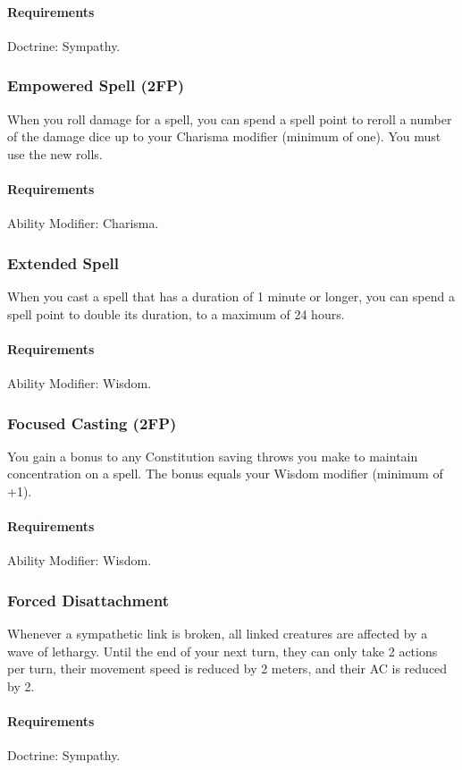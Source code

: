     \paragraph{Requirements} Doctrine: Sympathy.
\subsubsection{Empowered Spell (2FP)} \label{feat::empoweredspell}
    When you roll damage for a spell, you can spend a spell point to reroll a number of the damage dice up to your Charisma modifier (minimum of one).
    You must use the new rolls.
    \paragraph{Requirements} Ability Modifier: Charisma.
\subsubsection{Extended Spell} \label{feat::extendedspell}
    When you cast a spell that has a duration of 1 minute or longer, you can spend a spell point to double its duration, to a maximum of 24 hours.
    \paragraph{Requirements} Ability Modifier: Wisdom.
\subsubsection{Focused Casting (2FP)} \label{feat::focusedcasting}
    You gain a bonus to any Constitution saving throws you make to maintain concentration on a spell.
    The bonus equals your Wisdom modifier (minimum of +1).
    \paragraph{Requirements} Ability Modifier: Wisdom.
\subsubsection{Forced Disattachment} \label{feat::forceddisattachment}
    Whenever a sympathetic link is broken, all linked creatures are affected by a wave of lethargy.
    Until the end of your next turn, they can only take 2 actions per turn, their movement speed is reduced by 2 meters, and their AC is reduced by 2.
    \paragraph{Requirements} Doctrine: Sympathy.
